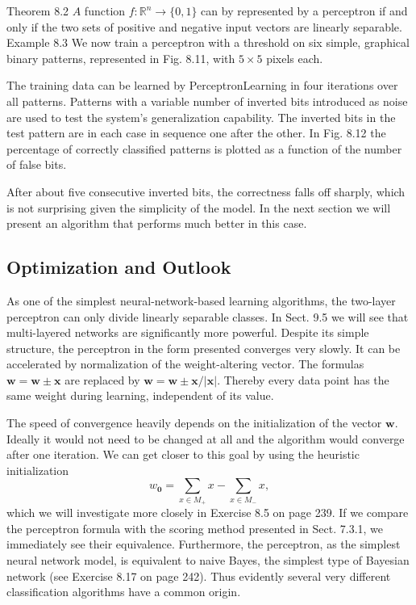 \documentclass[10pt]{book}
\begin{document}
Theorem 8.2 $A$ function $f: \mathbb{R}^{n} \rightarrow\{0,1\}$ can by represented by a perceptron if and only if the two sets of positive and negative input vectors are linearly separable.
Example 8.3 We now train a perceptron with a threshold on six simple, graphical binary patterns, represented in Fig. 8.11, with $5 \times 5$ pixels each.

The training data can be learned by PerceptronLearning in four iterations over all patterns. Patterns with a variable number of inverted bits introduced as noise are used to test the system's generalization capability. The inverted bits in the test pattern are in each case in sequence one after the other. In Fig. 8.12 the percentage of correctly classified patterns is plotted as a function of the number of false bits.

After about five consecutive inverted bits, the correctness falls off sharply, which is not surprising given the simplicity of the model. In the next section we will present an algorithm that performs much better in this case.

\subsection{Optimization and Outlook}
As one of the simplest neural-network-based learning algorithms, the two-layer perceptron can only divide linearly separable classes. In Sect. 9.5 we will see that multi-layered networks are significantly more powerful. Despite its simple structure, the perceptron in the form presented converges very slowly. It can be accelerated by normalization of the weight-altering vector. The formulas $\boldsymbol{w}=\boldsymbol{w} \pm \boldsymbol{x}$ are replaced by $\boldsymbol{w}=\boldsymbol{w} \pm \boldsymbol{x} /|\boldsymbol{x}|$. Thereby every data point has the same weight during learning, independent of its value.

The speed of convergence heavily depends on the initialization of the vector $\boldsymbol{w}$. Ideally it would not need to be changed at all and the algorithm would converge after one iteration. We can get closer to this goal by using the heuristic initialization
$$
w_{\mathbf{0}}=\sum_{x \in M_{+}} x-\sum_{x \in M_{-}} x,
$$
which we will investigate more closely in Exercise 8.5 on page 239.
If we compare the perceptron formula with the scoring method presented in Sect. 7.3.1, we immediately see their equivalence. Furthermore, the perceptron, as the simplest neural network model, is equivalent to naive Bayes, the simplest type of Bayesian network (see Exercise 8.17 on page 242). Thus evidently several very different classification algorithms have a common origin.
\end{document}
